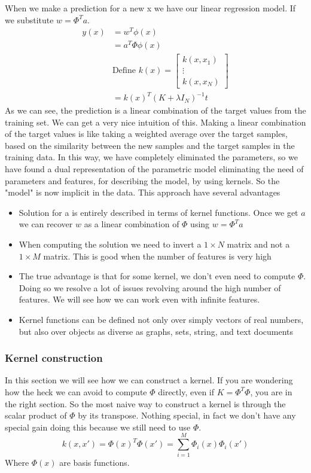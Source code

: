 \documentclass[main.tex]{subfiles}
\begin{document}
When we make a prediction for a new x we have our linear regression model. If we substitute $w=\Phi^Ta$.
\begin{align*}
    y(x) &= w^T\phi(x) \\
    &= a^T\Phi \phi(x) \\
    &\text{Define }k(x)=
    \begin{bmatrix}
    k(x,x_1) \\
    \vdots \\
    k(x,x_N)
    \end{bmatrix} \\
    &= k(x)^T (K + \lambda I_N)^{-1} t
\end{align*}
As we can see, the prediction is a linear combination of the target values from the training set. We can get a very nice intuition of this. Making a linear combination of the target values is like taking a weighted average over the target samples, based on the similarity between the new samples and the target samples in the training data. In this way, we have completely eliminated the parameters, so we have found a dual representation of the parametric model eliminating the need of parameters and features, for describing the model, by using kernels. So the "model" is now implicit in the data.
This approach have several advantages
\begin{itemize}
    \item Solution for a is entirely described in terms of kernel functions. Once we get $a$ we can recover $w$ as a linear combination of $\Phi$ using $w = \Phi^T a$
    \item When computing the solution we need to invert a $1 \times N$ matrix and not a $1 \times M$ matrix. This is good when the number of features is very high
    \item The true advantage is that for some kernel, we don't even need to compute $\Phi$. Doing so we resolve a lot of issues revolving around the high number of features. We will see how we can work even with infinite features.
    \item Kernel functions can be defined not only over simply vectors of real numbers, but also over objects as diverse as graphs, sets, string, and text documents
\end{itemize}

\subsubsection{Kernel construction}
In this section we will see how we can construct a kernel. If you are wondering how the heck we can avoid to compute $\Phi$ directly, even if $K=\Phi^T \Phi$, you are in the right section.
So the most naive way to construct a kernel is through the scalar product of $\Phi$ by its transpose. Nothing special, in fact we don't have any special gain doing this because we still need to use $\Phi$.
\begin{equation*}
    k(x,x') = \Phi(x)^T \Phi(x') = \sum_{i=1}^M \Phi_i(x) \Phi_i(x')
\end{equation*}
Where $\Phi(x)$ are basis functions.
\end{document}
